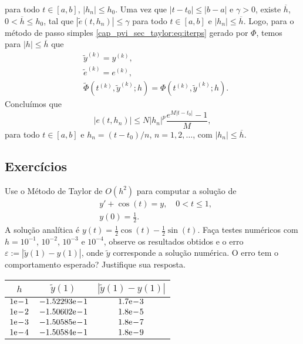 \begin{dem}
\begin{equation}
  \end{equation}
  para todo $t\in [a, b]$, $|h_n|\leq h_0$. Uma vez que $|t-t_0|\leq |b-a|$ e $\gamma >0$, existe $\overline{h}$, $0<\overline{h}\leq h_0$, tal que $\left|\tilde{e}\left(t, h_n\right)\right| \leq \gamma$ para todo $t\in [a, b]$ e $|h_n|\leq \overline{h}$. Logo, para o método de passo simples \eqref{cap_pvi_sec_taylor:eq:iterps} gerado por $\Phi$, temos para $|h|\leq\overline{h}$ que
  \begin{align}
    &\tilde{y}^{(k)} = y^{(k)},\\
    &\tilde{e}^{(k)} = e^{(k)},\\
    &\tilde{\Phi}\left(t^{(k)}, \tilde{y}^{(k)}; h\right) = \Phi\left(t^{(k)}, \tilde{y}^{(k)}; h\right).
  \end{align}
  Concluímos que
  \begin{equation}
    \left|e\left(t, h_n\right)\right| \leq N|h_n|^p\frac{e^{M|t-t_0|}-1}{M},
  \end{equation}
  para todo $t\in [a, b]$ e $h_n = (t-t_0)/n$, $n=1, 2, \ldots$, com $|h_n|\leq \overline{h}$.
\end{dem}

\subsection{Exercícios}

\begin{exer}
  Use o Método de Taylor de $O(h^2)$ para computar a solução de
  \begin{subequations}\label{cap_pvi_sec_taylor:eq:pvi_exer_0}
    \begin{align}
      &y' + \cos(t) = y,\quad 0 < t \leq 1,\\
      &y(0) = \frac{1}{2}.
    \end{align}
  \end{subequations}
  A solução analítica é $y(t) = \frac{1}{2}\cos(t) - \frac{1}{2}\sin(t)$. Faça testes numéricos com $h=10^{-1}$, $10^{-2}$, $10^{-3}$ e $10^{-4}$, observe os resultados obtidos e o erro $\varepsilon := |\tilde{y}(1) - y(1)|$, onde $\tilde{y}$ corresponde a solução numérica. O erro tem o comportamento esperado? Justifique sua resposta.
\end{exer}
\begin{resp}
  \begin{tabular}{c|c|c}
    $h$ & $\tilde{y}(1)$ & $\left|\tilde{y}(1)-y(1)\right|$\\\hline
    $1\mathrm{e}\!-\!1$ & $-1.52293\mathrm{e}\!-\!1$ & $1.7\mathrm{e}\!-\!3$ \\
    $1\mathrm{e}\!-\!2$ & $-1.50602\mathrm{e}\!-\!1$ & $1.8\mathrm{e}\!-\!5$ \\
    $1\mathrm{e}\!-\!3$ & $-1.50585\mathrm{e}\!-\!1$ & $1.8\mathrm{e}\!-\!7$ \\
    $1\mathrm{e}\!-\!4$ & $-1.50584\mathrm{e}\!-\!1$ & $1.8\mathrm{e}\!-\!9$ \\\hline
  \end{tabular}
\end{resp}

